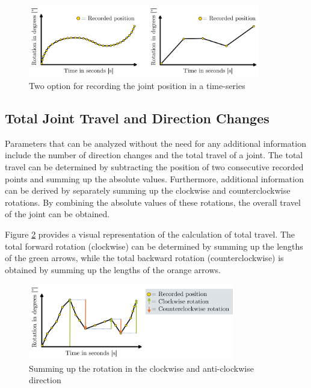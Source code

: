 \begin{figure}[H]
	\centerline{\includegraphics[width=0.90\textwidth]{figures/equionchange.png}}
	\caption{Two option for recording the joint position in a time-series}
	\label{equi}
\end{figure}


\subsection{Total Joint Travel and Direction Changes}
Parameters that can be analyzed without the need for any additional information include the number of direction changes and the total travel of a joint. The total travel can be determined by subtracting the position of two consecutive recorded points and summing up the absolute values. Furthermore, additional information can be derived by separately summing up the clockwise and counterclockwise rotations. By combining the absolute values of these rotations, the overall travel of the joint can be obtained.

Figure \ref{travel} provides a visual representation of the calculation of total travel. The total forward rotation (clockwise) can be determined by summing up the lengths of the green arrows, while the total backward rotation (counterclockwise) is obtained by summing up the lengths of the orange arrows.

\begin{figure}[H]
	\centerline{\includegraphics[width=0.8\textwidth]{figures/travel.png}}
	\caption{Summing up the rotation in the clockwise and anti-clockwise direction }
	\label{travel}
\end{figure}

